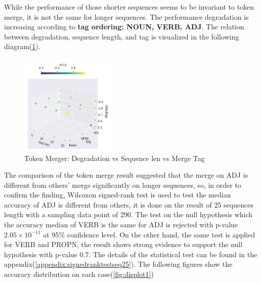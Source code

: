 \documentclass[12pt]{article}
\begin{document}
While the performance of those shorter sequences seems to be invariant to token merge, it is not the same for longer sequences. The performance degradation is increasing according to \textbf{tag ordering: NOUN, VERB, ADJ}. The relation between degradation, sequence length, and tag is visualized in the following diagram(\ref{fig:mergeScatter}).
\begin{figure} [!h]
\begin{center}
\includegraphics[width=0.4\textwidth]{figures/tokenmerg1.png}
\caption{Token Merger: Degradation vs Sequence len vs Merge Tag}
\label{fig:mergeScatter}
\end{center}
\end{figure}
The comparison of the token merge result suggested that the merge on ADJ is different from others' merge significantly on longer sequences, so, in order to confirm the finding, Wilcoxon signed-rank test is used to test the median accuracy of ADJ is different from others, it is done on the result of 25 sequences length with a sampling data point of 290. 
The test on the null hypothesis which the accuracy median of VERB is the same for ADJ is rejected with p-value $2.05\times10^{-11}$ at 95\% confidence level. On the other hand, the same test is applied for VERB and PROPN, the result shows strong evidence to support the null hypothesis with p-value $0.7$. The details of the statistical test can be found in the appendix(\ref{appendix:signedranktestseq25}). The following figures show the accuracy distribution on each case(\ref{fig:displot1}) 
\end{document}
